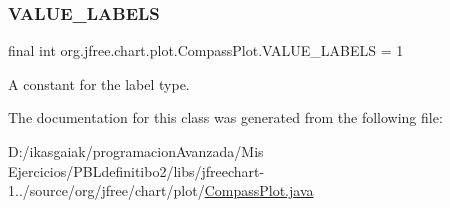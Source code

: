 \subsubsection{\texorpdfstring{V\+A\+L\+U\+E\+\_\+\+L\+A\+B\+E\+LS}{VALUE\_LABELS}}
{\footnotesize\ttfamily final int org.\+jfree.\+chart.\+plot.\+Compass\+Plot.\+V\+A\+L\+U\+E\+\_\+\+L\+A\+B\+E\+LS = 1\hspace{0.3cm}{\ttfamily [static]}}

A constant for the label type. 

The documentation for this class was generated from the following file\+:\begin{DoxyCompactItemize}
\item 
D\+:/ikasgaiak/programacion\+Avanzada/\+Mis Ejercicios/\+P\+B\+Ldefinitibo2/libs/jfreechart-\/1../source/org/jfree/chart/plot/\mbox{\hyperlink{_compass_plot_8java}{Compass\+Plot.\+java}}\end{DoxyCompactItemize}
